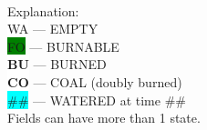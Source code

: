 \\
Explanation:\\
\colorbox{white}{\color[gray]{0.5}WA}  ---  EMPTY\\
\colorbox{green}{\color[gray]{0.5}FO}  ---  BURNABLE\\
\colorbox{white}{\color[rgb]{1,0,0}\textbf{BU}}  ---  BURNED\\
\colorbox{white}{\color[rgb]{0,0,0}\textbf{CO}}  ---  COAL (doubly burned)\\
\colorbox{cyan}{\#\#}  ---  WATERED at time \#\#\\
Fields can have more than 1 state.